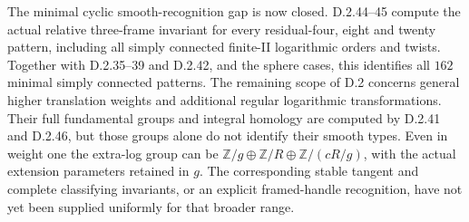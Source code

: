 The minimal cyclic smooth-recognition gap is now closed.
D.2.44--45 compute the actual relative three-frame invariant
for every residual-four, eight and twenty pattern, including
all simply connected finite-II logarithmic orders and twists.
Together with D.2.35--39 and D.2.42, and the sphere cases,
this identifies all $162$ minimal simply connected patterns.
The remaining scope of D.2 concerns general higher translation
weights and additional regular logarithmic transformations.
Their full fundamental groups and integral homology are
computed by D.2.41 and D.2.46, but those groups alone do not
identify their smooth types. Even in weight one the extra-log
group can be
$\mathbb Z/g\oplus\mathbb Z/R\oplus\mathbb Z/(cR/g)$,
with the actual extension parameters retained in $g$.
The corresponding stable tangent and complete classifying
invariants, or an explicit framed-handle recognition, have
not yet been supplied uniformly for that broader range.
